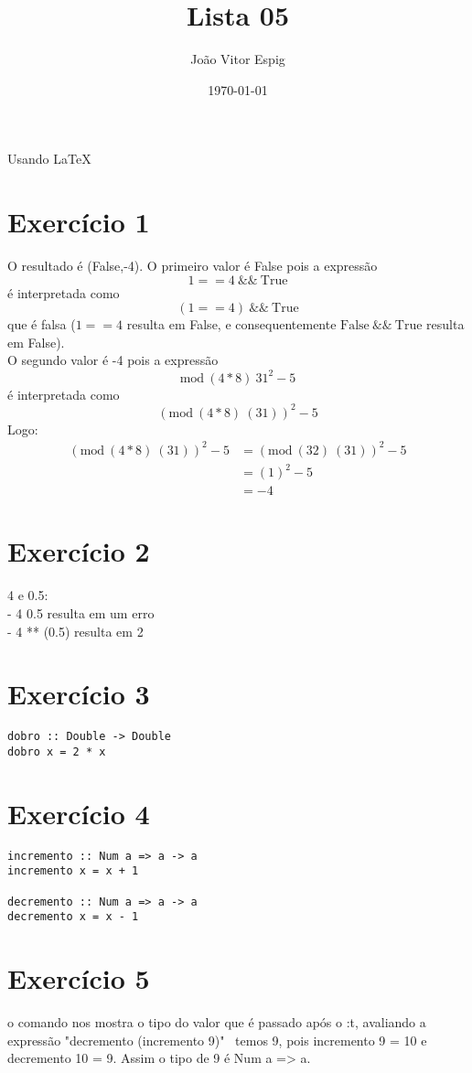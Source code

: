 \documentclass[12pt,a4paper,brazil]{article}
\title{Lista 05}
\author{João Vitor Espig}
\date{\today}
\begin{document}
\maketitle
Usando \LaTeX

\section*{Exercício 1}
O resultado é (False,-4).
O primeiro valor é False pois a expressão
$$1 == 4 \ \&\& \ \text{True}$$
é interpretada como
$$(1 == 4) \ \&\& \ \text{True}$$
que é falsa ($1 == 4$ resulta em False,
e consequentemente $\text{False} \ \&\& \ \text{True}$ resulta em False). \\
O segundo valor é -4 pois a expressão
$$\text{mod} \ (4*8) \ 31^2-5$$
é interpretada como
$$(\text{mod} \ (4*8) \ (31))^2-5$$
Logo:
\begin{align*}
(\text{mod} \ (4*8) \ (31))^2-5 & = (\text{mod} \ (32) \ (31))^2-5 \\
                                &= (1)^2 - 5 \\
                                &= -4
\end{align*}
\section*{Exercício 2}
4 e 0.5: \\
- 4 0.5 resulta em um erro \\
- 4 ** (0.5) resulta em 2

\section*{Exercício 3}
\begin{lstlisting}
dobro :: Double -> Double
dobro x = 2 * x
\end{lstlisting}

\section*{Exercício 4}
\begin{lstlisting}
incremento :: Num a => a -> a
incremento x = x + 1

decremento :: Num a => a -> a
decremento x = x - 1
\end{lstlisting}

\section*{Exercício 5}
o comando nos mostra o tipo do valor que é passado após o :t, avaliando a expressão
"decremento (incremento 9)" \ temos 9, pois incremento 9 = 10 e decremento 10 = 9.
Assim o tipo de 9 é Num a => a.
\end{document}
